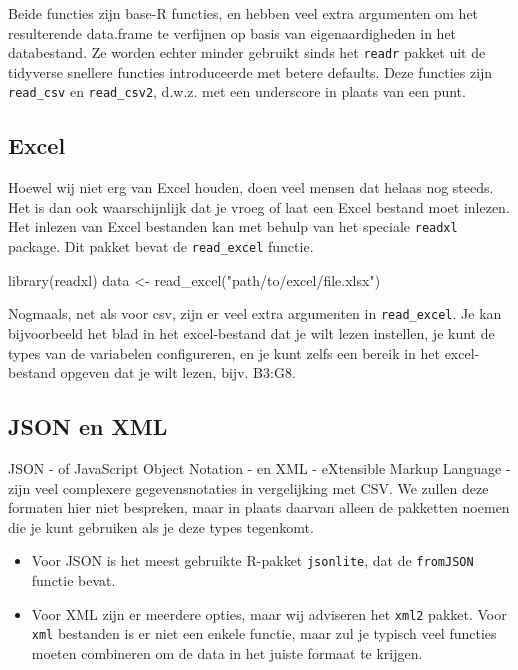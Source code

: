 \documentclass[]{tufte-book}
\newenvironment{Shaded}{}{}
\newcommand{\FunctionTok}[1]{\textcolor[rgb]{0.02,0.16,0.49}{#1}}
\newcommand{\NormalTok}[1]{#1}
\newcommand{\OtherTok}[1]{\textcolor[rgb]{0.00,0.44,0.13}{#1}}
\newcommand{\StringTok}[1]{\textcolor[rgb]{0.25,0.44,0.63}{#1}}
\providecommand{\tightlist}{%
  \setlength{\itemsep}{0pt}\setlength{\parskip}{0pt}}
\begin{document}
Beide functies zijn base-R functies, en hebben veel extra argumenten om het resulterende data.frame te verfijnen op basis van eigenaardigheden in het databestand. Ze worden echter minder gebruikt sinds het \texttt{readr} pakket uit de tidyverse snellere functies introduceerde met betere defaults. Deze functies zijn \texttt{read\_csv} en \texttt{read\_csv2}, d.w.z. met een underscore in plaats van een punt.

\hypertarget{excel}{%
\subsection{Excel}\label{excel}}

Hoewel wij niet erg van Excel houden, doen veel mensen dat helaas nog steeds. Het is dan ook waarschijnlijk dat je vroeg of laat een Excel bestand moet inlezen. Het inlezen van Excel bestanden kan met behulp van het speciale \texttt{readxl} package. Dit pakket bevat de \texttt{read\_excel} functie.

\begin{Shaded}
\begin{Highlighting}[]
\FunctionTok{library}\NormalTok{(readxl)}
\NormalTok{data }\OtherTok{\textless{}{-}} \FunctionTok{read\_excel}\NormalTok{(}\StringTok{"path/to/excel/file.xlsx"}\NormalTok{)}
\end{Highlighting}
\end{Shaded}

Nogmaals, net als voor csv, zijn er veel extra argumenten in \texttt{read\_excel}. Je kan bijvoorbeeld het blad in het excel-bestand dat je wilt lezen instellen, je kunt de types van de variabelen configureren, en je kunt zelfs een bereik in het excel-bestand opgeven dat je wilt lezen, bijv. B3:G8.

\hypertarget{json-en-xml}{%
\subsection{JSON en XML}\label{json-en-xml}}

JSON - of JavaScript Object Notation - en XML - eXtensible Markup Language - zijn veel complexere gegevensnotaties in vergelijking met CSV. We zullen deze formaten hier niet bespreken, maar in plaats daarvan alleen de pakketten noemen die je kunt gebruiken als je deze types tegenkomt.

\begin{itemize}
\tightlist
\item
  Voor JSON is het meest gebruikte R-pakket \texttt{jsonlite}, dat de \texttt{fromJSON} functie bevat.
\item
  Voor XML zijn er meerdere opties, maar wij adviseren het \texttt{xml2} pakket. Voor \texttt{xml} bestanden is er niet een enkele functie, maar zul je typisch veel functies moeten combineren om de data in het juiste formaat te krijgen.
\end{itemize}
\end{document}
